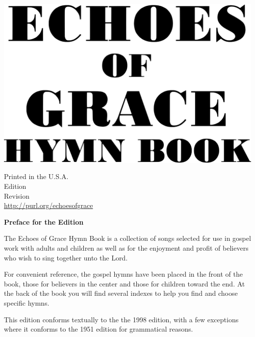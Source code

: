 \documentclass{book}
\renewcommand{\year}{\DTMfetchyear{now} }
\begin{document}

\vspace*{1in}

\noindent\hfil\includegraphics[scale=0.06]{booklayout/bodoni-scan}\hfil

\vfill



\pagebreak

\vspace*{\fill}
\begin{center}
Printed in the U.S.A.\\
\year Edition\\
Revision \\
\url{http://purl.org/echoesofgrace}
\end{center}

\pagebreak


\vspace*{1.5in}
\noindent\hfil{\textbf{Preface for the \year Edition}}\hfil

The {\textit{}Echoes of Grace Hymn Book} is a collection of songs selected for
use in gospel work with adults and children as well as for the enjoyment and
profit of believers who wish to sing together unto the Lord.

For convenient reference, the gospel hymns have been placed in the front of the
book, those for believers in the center and those for children toward the end.
At the back of the book you will find several indexes to help you find and
choose specific hymns.

This edition conforms textually to the the 1998 edition, with a few exceptions
where it conforms to the 1951 edition for grammatical reasons.
\end{document}
